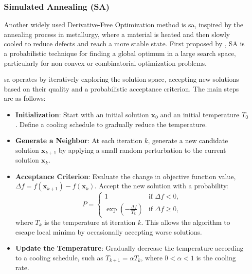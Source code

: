 \subsubsection{Simulated Annealing (SA)}
\label{subsubsection:simulated_annealing}
Another widely used Derivative-Free Optimization method is \ac{sa}, inspired by the annealing process in metallurgy, where a material is heated and then slowly cooled to reduce defects and reach a more stable state. First proposed by \citet{kirkpatrick1983optimization}, SA is a probabilistic technique for finding a global optimum in a large search space, particularly for non-convex or combinatorial optimization problems.

\ac{sa} operates by iteratively exploring the solution space, accepting new solutions based on their quality and a probabilistic acceptance criterion. The main steps are as follows:

\begin{itemize}
    \item \textbf{Initialization}: Start with an initial solution \(\mathbf{x}_0\) and an initial temperature \(T_0\). Define a cooling schedule to gradually reduce the temperature.
    
    \item \textbf{Generate a Neighbor}: At each iteration \(k\), generate a new candidate solution \(\mathbf{x}_{k+1}\) by applying a small random perturbation to the current solution \(\mathbf{x}_k\).
    
    \item \textbf{Acceptance Criterion}: Evaluate the change in objective function value, \(\Delta f = f(\mathbf{x}_{k+1}) - f(\mathbf{x}_k)\). Accept the new solution with a probability:
    \begin{equation*}
    P = 
    \begin{cases} 
    1 & \text{if } \Delta f < 0, \\
    \exp\left(-\frac{\Delta f}{T_k}\right) & \text{if } \Delta f \geq 0,
    \end{cases}
    \end{equation*}
    where \(T_k\) is the temperature at iteration \(k\). This allows the algorithm to escape local minima by occasionally accepting worse solutions.
    
    \item \textbf{Update the Temperature}: Gradually decrease the temperature according to a cooling schedule, such as \(T_{k+1} = \alpha T_k\), where \(0 < \alpha < 1\) is the cooling rate.
\end{itemize}

